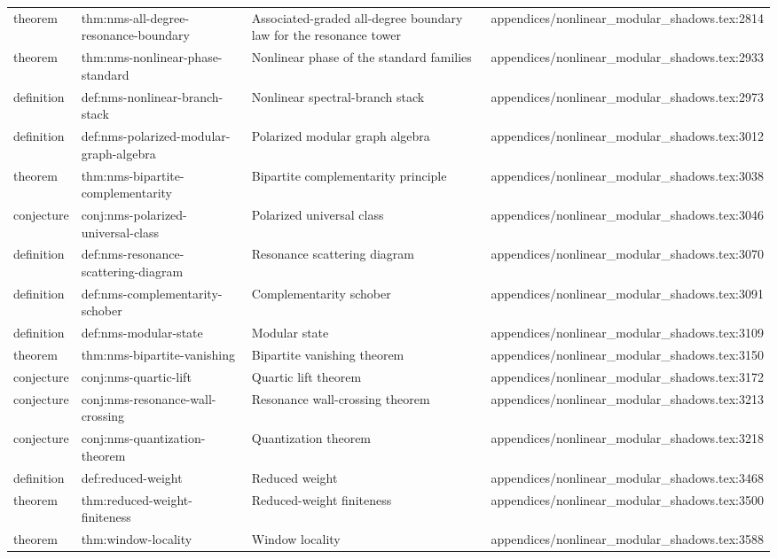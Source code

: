 \documentclass[11pt]{article}
\begin{document}
\begin{longtable}{L{0.10\textwidth}L{0.26\textwidth}L{0.42\textwidth}L{0.22\textwidth}}
theorem & thm:nms-all-degree-resonance-boundary & Associated-graded all-degree boundary law for the resonance tower & appendices/nonlinear\_modular\_shadows.tex:2814\\
theorem & thm:nms-nonlinear-phase-standard & Nonlinear phase of the standard families & appendices/nonlinear\_modular\_shadows.tex:2933\\
definition & def:nms-nonlinear-branch-stack & Nonlinear spectral-branch stack & appendices/nonlinear\_modular\_shadows.tex:2973\\
definition & def:nms-polarized-modular-graph-algebra & Polarized modular graph algebra & appendices/nonlinear\_modular\_shadows.tex:3012\\
theorem & thm:nms-bipartite-complementarity & Bipartite complementarity principle & appendices/nonlinear\_modular\_shadows.tex:3038\\
conjecture & conj:nms-polarized-universal-class & Polarized universal class & appendices/nonlinear\_modular\_shadows.tex:3046\\
definition & def:nms-resonance-scattering-diagram & Resonance scattering diagram & appendices/nonlinear\_modular\_shadows.tex:3070\\
definition & def:nms-complementarity-schober & Complementarity schober & appendices/nonlinear\_modular\_shadows.tex:3091\\
definition & def:nms-modular-state & Modular state & appendices/nonlinear\_modular\_shadows.tex:3109\\
theorem & thm:nms-bipartite-vanishing & Bipartite vanishing theorem & appendices/nonlinear\_modular\_shadows.tex:3150\\
conjecture & conj:nms-quartic-lift & Quartic lift theorem & appendices/nonlinear\_modular\_shadows.tex:3172\\
conjecture & conj:nms-resonance-wall-crossing & Resonance wall-crossing theorem & appendices/nonlinear\_modular\_shadows.tex:3213\\
conjecture & conj:nms-quantization-theorem & Quantization theorem & appendices/nonlinear\_modular\_shadows.tex:3218\\
definition & def:reduced-weight & Reduced weight & appendices/nonlinear\_modular\_shadows.tex:3468\\
theorem & thm:reduced-weight-finiteness & Reduced-weight finiteness & appendices/nonlinear\_modular\_shadows.tex:3500\\
theorem & thm:window-locality & Window locality & appendices/nonlinear\_modular\_shadows.tex:3588\\

\end{longtable}
\end{document}
